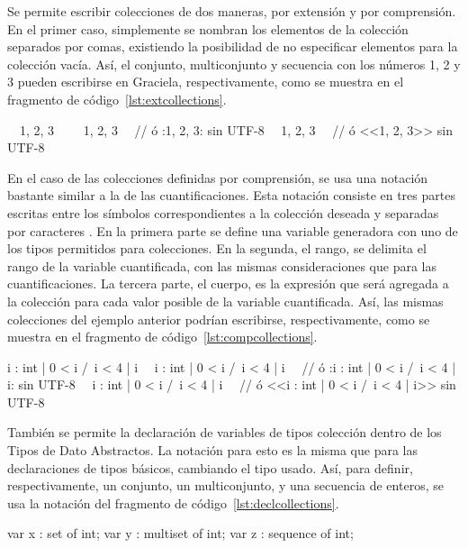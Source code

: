 Se permite escribir colecciones de dos maneras, por extensión y por comprensión.
En el primer caso, simplemente se nombran los elementos de la colección
separados por comas, existiendo la posibilidad de no especificar elementos para
la colección vacía. Así, el conjunto, multiconjunto y secuencia con los números
1, 2 y 3 pueden escribirse en Graciela, respectivamente, como se muestra en el
fragmento de código~\ref{lst:extcollections}.

\begin{gracielacode}[caption=Expresiones de tipos \textit{colección} por extensión, label=lst:extcollections]
{~~1, 2, 3~~}
~\Lbag~1, 2, 3~\Rbag~ // ó {:1, 2, 3:} sin UTF-8
~\Lseq~1, 2, 3~\Rseq~ // ó <<1, 2, 3>> sin UTF-8
\end{gracielacode}

En el caso de las colecciones definidas por comprensión, se usa una notación
bastante similar a la de las cuantificaciones. Esta notación consiste en tres
partes escritas entre los símbolos correspondientes a la colección deseada y
separadas por caracteres \ingra{|}. En la primera parte se define una variable
generadora con uno de los tipos permitidos para colecciones. En la segunda, el
rango, se delimita el rango de la variable cuantificada, con las mismas
consideraciones que para las cuantificaciones. La tercera parte, el cuerpo, es
la expresión que será agregada a la colección para cada valor posible de la
variable cuantificada. Así, las mismas colecciones del ejemplo anterior podrían
escribirse, respectivamente, como se muestra en el
fragmento de código~\ref{lst:compcollections}.

\begin{gracielacode}[caption=Expresiones de tipos \textit{colección} por comprensión, label=lst:compcollections]
{i : int | 0 < i /\ i < 4 | i}
~\Lbag~i : int | 0 < i /\ i < 4 | i~\Rbag~
  // ó {:i : int | 0 < i /\ i < 4 | i:} sin UTF-8
~\Lseq~i : int | 0 < i /\ i < 4 | i~\Rseq~
  // ó <<i : int | 0 < i /\ i < 4 | i>> sin UTF-8
\end{gracielacode}

También se permite la declaración de variables de tipos colección dentro de los
Tipos de Dato Abstractos. La notación para esto es la misma que para las
declaraciones de tipos básicos, cambiando el tipo usado. Así, para definir,
respectivamente, un conjunto, un multiconjunto, y una secuencia de enteros, se
usa la notación del fragmento de código~\ref{lst:declcollections}.

\begin{gracielacode}[caption=Declaración de variables de tipos \textit{colección}, label=lst:declcollections]
var x : set of int;
var y : multiset of int;
var z : sequence of int;
\end{gracielacode}


